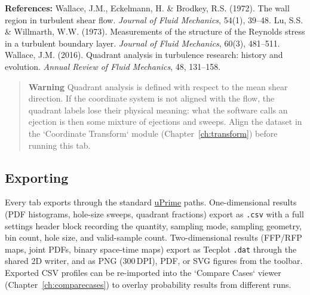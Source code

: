 \noindent\textbf{References:} Wallace, J.M., Eckelmann, H. \& Brodkey, R.S. (1972). The wall region in turbulent shear flow. \textit{Journal of Fluid Mechanics}, 54(1), 39--48. Lu, S.S. \& Willmarth, W.W. (1973). Measurements of the structure of the Reynolds stress in a turbulent boundary layer. \textit{Journal of Fluid Mechanics}, 60(3), 481--511. Wallace, J.M. (2016). Quadrant analysis in turbulence research: history and evolution. \textit{Annual Review of Fluid Mechanics}, 48, 131--158.

\begin{quote}
\textbf{Warning}
Quadrant analysis is defined with respect to the mean shear direction. If the coordinate system is not aligned with the flow, the quadrant labels lose their physical meaning: what the software calls an ejection is then some mixture of ejections and sweeps. Align the dataset in the `Coordinate Transform` module (Chapter~\ref{ch:transform}) before running this tab.
\end{quote}

\subsection{Exporting}

Every tab exports through the standard \href{https://cmdrryder.github.io/uPrime/}{uPrime} paths. One-dimensional results (PDF histograms, hole-size sweeps, quadrant fractions) export as \texttt{.csv} with a full settings header block recording the quantity, sampling mode, sampling geometry, bin count, hole size, and valid-sample count. Two-dimensional results (FFP/RFP maps, joint PDFs, binary space-time maps) export as Tecplot \texttt{.dat} through the shared 2D writer, and as PNG (300\,DPI), PDF, or SVG figures from the toolbar. Exported CSV profiles can be re-imported into the `Compare Cases` viewer (Chapter~\ref{ch:comparecases}) to overlay probability results from different runs.

